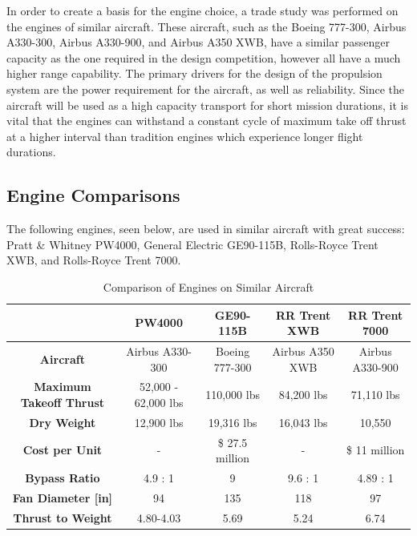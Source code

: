 


In order to create a basis for the engine choice, a trade study was performed on the engines of similar aircraft. These aircraft, such as the Boeing 777-300, Airbus A330-300, Airbus A330-900, and Airbus A350 XWB, have a similar passenger capacity as the one required in the design competition, however all have a much higher range capability. The primary drivers for the design of the propulsion system are the power requirement for the aircraft, as well as reliability. Since the aircraft will be used as a high capacity transport for short mission durations, it is vital that the engines can withstand a constant cycle of maximum take off thrust at a higher interval than tradition engines which experience longer flight durations. 

\subsection{Engine Comparisons}

The following engines, seen below, are used in similar aircraft with great success: Pratt \& Whitney PW4000, General Electric GE90-115B, Rolls-Royce Trent XWB, and Rolls-Royce Trent 7000.

\begin{table}[!h]
    \centering
        \caption{Comparison of Engines on Similar Aircraft}
    \begin{tabular}{|c||c|c|c|c|}\toprule
         & \textbf{PW4000} & \textbf{GE90-115B} & \textbf{RR Trent XWB} & \textbf{RR Trent 7000} \\\hline \hline
         \textbf{Aircraft} & Airbus A330-300 & Boeing 777-300 & Airbus A350 XWB & Airbus A330-900\\ \hline
         \textbf{Maximum Takeoff Thrust} & 52,000 - 62,000 lbs \cite{PW} & 110,000 lbs \cite{ge90} & 84,200 lbs \cite{xwb} & 71,110 lbs \cite{butterworth}\\ \hline
         \textbf{Dry Weight} & 12,900 lbs \cite{FAApw} & 19,316 lbs \cite{ge90} & 16,043 lbs \cite{xwb2} & 10,550 \cite{butterworth} \\ \hline
         \textbf{Cost per Unit} & - & \$ 27.5 million \cite{gecost} & - & \$ 11 million \cite{butterworth} \\ \hline
         \textbf{Bypass Ratio} & 4.9 \cite{PW} : 1 \cite{PW} & 9 \cite{safran} & 9.6 : 1 \cite{xwb} & 4.89 : 1 \cite{butterworth} \\ \hline
         \textbf{Fan Diameter [in]} & 94 \cite{PW} & 135 \cite{ge} & 118 \cite{xwb} &  97 \cite{butterworth}\\ \hline
         \textbf{Thrust to Weight} & 4.80-4.03 & 5.69 & 5.24 & 6.74 \\ \bottomrule
    \end{tabular}
    \label{tab:enginecomp}
\end{table}

